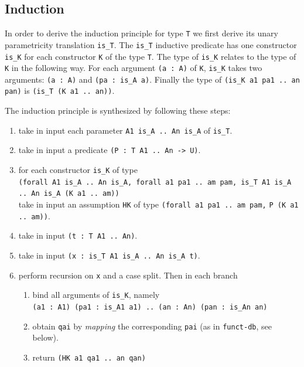 \documentclass[a4paper,UKenglish,cleveref, autoref]{lipics-v2019}
\begin{document}
\subsection{Induction} %
\label{sec:induction}

In order to derive the induction principle for type
\lstinline+T+ we first derive its unary parametricity
translation \lstinline+is_T+. 
The \lstinline+is_T+ inductive
predicate has one constructor \lstinline+is_K+ for each
constructor \lstinline+K+ of the type \lstinline+T+.
The type of \lstinline+is_K+ relates to the type of
\lstinline+K+ in the following way. For each
argument \lstinline+(a : A)+
of \lstinline+K+, \lstinline+is_K+ takes two arguments:
\lstinline+(a : A)+ and \lstinline+(pa : is_A a)+.
Finally the type of \lstinline+(is_K a1 pa1 .. an pan)+ is
\lstinline+(is_T (K a1 .. an))+.

The induction principle is synthesized by following these steps:
\begin{enumerate}
\item take in input each parameter
  \lstinline+A1 is_A .. An is_A+ of \lstinline+is_T+.
\item take in input a predicate \lstinline+(P : T A1 .. An -> U)+.
\item for each constructor \lstinline+is_K+ of
	type \\
		\lstinline+(forall A1 is_A .. An is_A, forall a1 pa1 .. am pam, is_T A1 is_A .. An is_A (K a1 .. am))+ \\
  take in input an assumption \lstinline+HK+ of type
		\lstinline+(forall a1 pa1 .. am pam,+
		\lstinline+P (K a1 .. am))+.
\item take in input \lstinline+(t : T A1 .. An)+.
\item take in input \lstinline+(x : is_T A1 is_A .. An is_A t)+.
\item perform recursion on \lstinline+x+ and a case split. Then
	in each branch
\begin{enumerate}
\item bind all arguments of \lstinline+is_K+, namely\\
  \lstinline+(a1 : A1) (pa1 : is_A1 a1) .. (an : An) (pan : is_An an)+
\item obtain
  \lstinline+qai+ by \emph{mapping} the corresponding
  \lstinline+pai+ (as in \lstinline+funct-db+, see below).
\item return \lstinline+(HK a1 qa1 .. an qan)+
\end{enumerate}
\end{enumerate}
\end{document}
